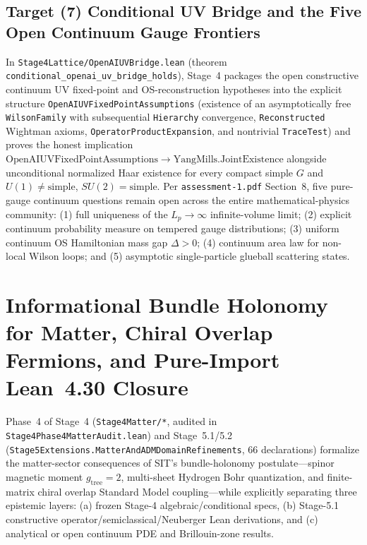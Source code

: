 \subsection{Target (7) Conditional UV Bridge and the Five Open Continuum Gauge Frontiers}

In \texttt{Stage4\allowbreak{}Lattice/Open\allowbreak{}AIUVBridge.\allowbreak{}lean} (theorem \texttt{conditional\_\allowbreak{}openai\_\allowbreak{}uv\_\allowbreak{}bridge\_\allowbreak{}holds}), Stage~4 packages the open constructive continuum UV fixed-point and OS-reconstruction hypotheses into the explicit structure \texttt{Open\allowbreak{}AIUVFixed\allowbreak{}Point\allowbreak{}Assumptions} (existence of an asymptotically free \texttt{WilsonFamily} with subsequential \texttt{Hierarchy} convergence, \texttt{Reconstructed} Wightman axioms, \texttt{Operator\allowbreak{}Product\allowbreak{}Expansion}, and nontrivial \texttt{TraceTest}) and proves the honest implication $\mathrm{OpenAIUVFixedPointAssumptions} \to \mathrm{YangMills.JointExistence}$ alongside unconditional normalized Haar existence for every compact simple $G$ and $U(1) \ne \mathrm{simple}$, $SU(2) = \mathrm{simple}$. Per \texttt{assessment-1.pdf} Section~8, five pure-gauge continuum questions remain open across the entire mathematical-physics community: (1) full uniqueness of the $L_p \to \infty$ infinite-volume limit; (2) explicit continuum probability measure on tempered gauge distributions; (3) uniform continuum OS Hamiltonian mass gap $\Delta > 0$; (4) continuum area law for non-local Wilson loops; and (5) asymptotic single-particle glueball scattering states.

\section{Informational Bundle Holonomy for Matter, Chiral Overlap Fermions, and Pure-Import Lean~4.30 Closure}
\label{sec:stage4-matter-holonomy}

Phase~4 of Stage~4 (\texttt{Stage4Matter/*}, audited in \texttt{Stage4\allowbreak{}Phase4\allowbreak{}Matter\allowbreak{}Audit.\allowbreak{}lean}) and Stage~5.1/5.2 (\texttt{Stage5\allowbreak{}Extensions.\allowbreak{}Matter\allowbreak{}And\allowbreak{}ADMDomain\allowbreak{}Refinements}, $66$ declarations) formalize the matter-sector consequences of SIT's bundle-holonomy postulate---spinor magnetic moment $g_{\mathrm{tree}} = 2$, multi-sheet Hydrogen Bohr quantization, and finite-matrix chiral overlap Standard Model coupling---while explicitly separating three epistemic layers: (a) frozen Stage-4 algebraic/conditional specs, (b) Stage-5.1 constructive operator/semiclassical/Neuberger Lean derivations, and (c) analytical or open continuum PDE and Brillouin-zone results.

